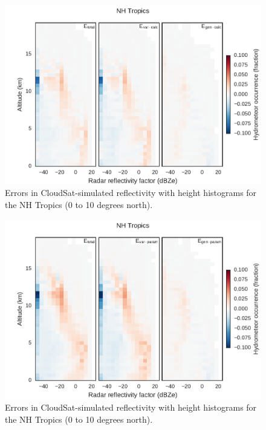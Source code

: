 \begin{figure}[htbp]
\centering
\includegraphics{graphics/subgrid2_cfadDbze94_NHTropics_gen-var-calc_diff.pdf}
\caption{\label{fig:cfadTropicsCalcDiff}Errors in CloudSat-simulated
reflectivity with height histograms for the NH Tropics (0 to 10 degrees
north).}\label{fig:cfadTropicsCalcDiff}
\end{figure}

\begin{figure}[htbp]
\centering
\includegraphics{graphics/subgrid2_cfadDbze94_NHTropics_gen-var-param_diff.pdf}
\caption{\label{fig:cfadTropicsParamDiff}Errors in CloudSat-simulated
reflectivity with height histograms for the NH Tropics (0 to 10 degrees
north).}\label{fig:cfadTropicsParamDiff}
\end{figure}


